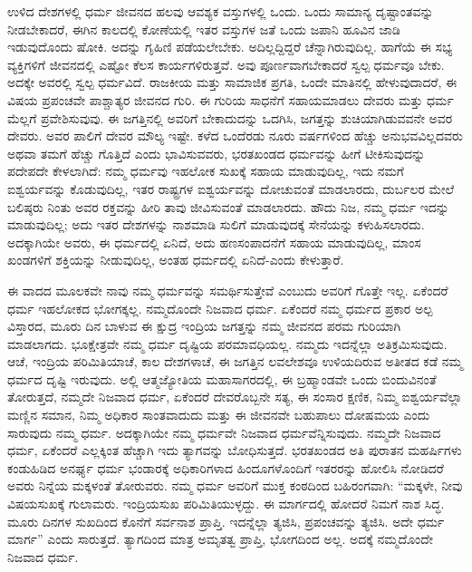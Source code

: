 ಉಳಿದ ದೇಶಗಳಲ್ಲಿ ಧರ್ಮ ಜೀವನದ ಹಲವು ಆವಶ್ಯಕ ವಸ್ತುಗಳಲ್ಲಿ ಒಂದು. ಒಂದು ಸಾಮಾನ್ಯ ದೃಷ್ಟಾಂತವನ್ನು ನೀಡಬೇಕಾದರೆ, ಈಗಿನ ಕಾಲದಲ್ಲಿ ಕೋಣೆಯಲ್ಲಿ ಇತರ ವಸ್ತುಗಳ ಜತೆ ಒಂದು ಜಪಾನಿ ಹೂವಿನ ಜಾಡಿ ಇಡುವುದೊಂದು ಷೋಕಿ. ಅದನ್ನು ಗೃಹಿಣಿ ಪಡೆಯಲೇಬೇಕು. ಅದಿಲ್ಲದ್ದಿದ್ದರೆ ಚೆನ್ನಾಗಿರುವುದಿಲ್ಲ. ಹಾಗೆಯೆ ಈ ಸಭ್ಯ ವ್ಯಕ್ತಿಗಳಿಗೆ ಜೀವನದಲ್ಲಿ ಎಷ್ಟೋ ಕೆಲಸ ಕಾರ್ಯಗಳಿರುತ್ತವೆ. ಅವು ಪೂರ್ಣವಾಗಬೇಕಾದರೆ ಸ್ವಲ್ಪ ಧರ್ಮವೂ ಬೇಕು. ಅದಕ್ಕೇ ಅವರಲ್ಲಿ ಸ್ವಲ್ಪ ಧರ್ಮವಿದೆ. ರಾಜಕೀಯ ಮತ್ತು ಸಾಮಾಜಿಕ ಪ್ರಗತಿ, ಒಂದೇ ಮಾತಿನಲ್ಲಿ ಹೇಳುವುದಾದರೆ, ಈ ವಿಷಯ ಪ್ರಪಂಚವೇ ಪಾಶ್ಚಾತ್ಯರ ಜೀವನದ ಗುರಿ. ಈ ಗುರಿಯ ಸಾಧನೆಗೆ ಸಹಾಯಮಾಡಲು ದೇವರು ಮತ್ತು ಧರ್ಮ ಮೆಲ್ಲಗೆ ಪ್ರವೇಶಿಸುವುವು. ಈ ಜಗತ್ತಿನಲ್ಲಿ ಅವರಿಗೆ ಬೇಕಾದುದನ್ನು ಒದಗಿಸಿ, ಜಗತ್ತನ್ನು ಶುಚಿಯಾಗಿಡುವವನೇ ಅವರ ದೇವರು. ಅವರ ಪಾಲಿಗೆ ದೇವರ ಮೌಲ್ಯ ಇಷ್ಟೇ. ಕಳೆದ ಒಂದೆರಡು ನೂರು ವರ್ಷಗಳಿಂದ ಹೆಚ್ಚು ಅನುಭವವಿಲ್ಲದವರು ಅಥವಾ ತಮಗೆ ಹೆಚ್ಚು ಗೊತ್ತಿದೆ ಎಂದು ಭಾವಿಸುವವರು, ಭರತಖಂಡದ ಧರ್ಮವನ್ನು ಹೀಗೆ ಟೀಕಿಸುವುದನ್ನು ಪದೇಪದೇ ಕೇಳಲಾಗಿದೆ: ನಮ್ಮ ಧರ್ಮವು ಇಹಲೋಕ ಸುಖಕ್ಕೆ ಸಹಾಯ ಮಾಡುವುದಿಲ್ಲ, ಇದು ನಮಗೆ ಐಶ್ವರ್ಯವನ್ನು ಕೊಡುವುದಿಲ್ಲ, ಇತರ ರಾಷ್ಟ್ರಗಳ ಐಶ್ವರ್ಯವನ್ನು ದೋಚುವಂತೆ ಮಾಡಲಾರದು, ದುರ್ಬಲರ ಮೇಲೆ ಬಲಿಷ್ಠರು ನಿಂತು ಅವರ ರಕ್ತವನ್ನು ಹೀರಿ ತಾವು ಜೀವಿಸುವಂತೆ ಮಾಡಲಾರದು. ಹೌದು ನಿಜ, ನಮ್ಮ ಧರ್ಮ ಇದನ್ನು ಮಾಡುವುದಿಲ್ಲ; ಅದು ಇತರ ದೇಶಗಳನ್ನು ನಾಶಮಾಡಿ ಸುಲಿಗೆ ಮಾಡುವುದಕ್ಕೆ ಸೇನೆಯನ್ನು ಕಳುಹಿಸಲಾರದು. ಅದಕ್ಕಾಗಿಯೇ ಅವರು, ಈ ಧರ್ಮದಲ್ಲಿ ಏನಿದೆ, ಅದು ಹಣಸಂಪಾದನೆಗೆ ಸಹಾಯ ಮಾಡುವುದಿಲ್ಲ, ಮಾಂಸ ಖಂಡಗಳಿಗೆ ಶಕ್ತಿಯನ್ನು ನೀಡುವುದಿಲ್ಲ, ಅಂತಹ ಧರ್ಮದಲ್ಲಿ ಏನಿದೆ-ಎಂದು ಕೇಳುತ್ತಾರೆ.

ಈ ವಾದದ ಮೂಲಕವೇ ನಾವು ನಮ್ಮ ಧರ್ಮವನ್ನು ಸಮರ್ಥಿಸುತ್ತೇವೆ ಎಂಬುದು ಅವರಿಗೆ ಗೊತ್ತೇ ಇಲ್ಲ. ಏಕೆಂದರೆ ಧರ್ಮ ಇಹಲೋಕದ ಭೋಗಕ್ಕಲ್ಲ. ನಮ್ಮದೊಂದೇ ನಿಜವಾದ ಧರ್ಮ. ಏಕೆಂದರೆ ನಮ್ಮ ಧರ್ಮದ ಪ್ರಕಾರ ಅಲ್ಪ ವಿಸ್ತಾರದ, ಮೂರು ದಿನ ಬಾಳುವ ಈ ಕ್ಷುದ್ರ ಇಂದ್ರಿಯ ಜಗತ್ತನ್ನು ನಮ್ಮ ಜೀವನದ ಪರಮ ಗುರಿಯಾಗಿ ಮಾಡಲಾಗದು. ಭೂಕ್ಷೇತ್ರವೇ ನಮ್ಮ ಧರ್ಮ ದೃಷ್ಟಿಯ ಪರಮಾವಧಿಯಲ್ಲ. ನಮ್ಮದು ಇದನ್ನೆಲ್ಲಾ ಅತಿಕ್ರಮಿಸುವುದು. ಆಚೆ, ಇಂದ್ರಿಯ ಪರಿಮಿತಿಯಾಚೆ, ಕಾಲ ದೇಶಗಳಾಚೆ, ಈ ಜಗತ್ತಿನ ಲವಲೇಶವೂ ಉಳಿಯದಿರುವ ಅತೀತದ ಕಡೆ ನಮ್ಮ ಧರ್ಮದ ದೃಷ್ಟಿ ಇರುವುದು. ಅಲ್ಲಿ ಆತ್ಮಜ್ಯೋತಿಯ ಮಹಾಸಾಗರದಲ್ಲಿ, ಈ ಬ್ರಹ್ಮಾಂಡವೇ ಒಂದು ಬಿಂದುವಿನಂತೆ ತೋರುತ್ತದೆ, ನಮ್ಮದೇ ನಿಜವಾದ ಧರ್ಮ, ಏಕೆಂದರೆ ದೇವರೊಬ್ಬನೇ ಸತ್ಯ, ಈ ಸಂಸಾರ ಕ್ಷಣಿಕ, ನಿಮ್ಮ ಐಶ್ವರ್ಯವೆಲ್ಲಾ ಮಣ್ಣಿನ ಸಮಾನ, ನಿಮ್ಮ ಅಧಿಕಾರ ಸಾಂತವಾದುದು ಮತ್ತು ಈ ಜೀವನವೇ ಬಹುಪಾಲು ದೋಷಮಯ ಎಂದು ಸಾರುವುದು ನಮ್ಮ ಧರ್ಮ. ಅದಕ್ಕಾಗಿಯೇ ನಮ್ಮ ಧರ್ಮವೇ ನಿಜವಾದ ಧರ್ಮವೆನ್ನಿಸುವುದು. ನಮ್ಮದೇ ನಿಜವಾದ ಧರ್ಮ, ಏಕೆಂದರೆ ಎಲ್ಲಕ್ಕಿಂತ ಹೆಚ್ಚಾಗಿ ಇದು ತ್ಯಾಗವನ್ನು ಬೋಧಿಸುತ್ತದೆ. ಭರತಖಂಡದ ಅತಿ ಪುರಾತನ ಮಹರ್ಷಿಗಳು ಕಂಡುಹಿಡಿದ ಅನರ್ಘ್ಯ ಧರ್ಮ ಭಂಡಾರಕ್ಕೆ ಅಧಿಕಾರಿಗಳಾದ ಹಿಂದೂಗಳೊಂದಿಗೆ ಇತರರನ್ನು ಹೋಲಿಸಿ ನೋಡಿದರೆ ಅವರು ನಿನ್ನೆಯ ಮಕ್ಕಳಂತೆ ತೋರುವರು. ನಮ್ಮ ಧರ್ಮ ಅವರಿಗೆ ಮುಕ್ತ ಕಂಠದಿಂದ ಬಹಿರಂಗವಾಗಿ: “ಮಕ್ಕಳೇ, ನೀವು ವಿಷಯಸುಖಕ್ಕೆ ಗುಲಾಮರು. ಇಂದ್ರಿಯಸುಖ ಪರಿಮಿತಿಯುಳ್ಳದ್ದು. ಈ ಮಾರ್ಗದಲ್ಲಿ ಹೋದರೆ ನಿಮಗೆ ನಾಶ ಸಿದ್ಧ. ಮೂರು ದಿನಗಳ ಸುಖದಿಂದ ಕೊನೆಗೆ ಸರ್ವನಾಶ ಪ್ರಾಪ್ತಿ. ಇದನ್ನೆಲ್ಲಾ ತ್ಯಜಿಸಿ, ಪ್ರಪಂಚವನ್ನು ತ್ಯಜಿಸಿ. ಅದೇ ಧರ್ಮ ಮಾರ್ಗ” ಎಂದು ಸಾರುತ್ತದೆ. ತ್ಯಾಗದಿಂದ ಮಾತ್ರ ಅಮೃತತ್ವ ಪ್ರಾಪ್ತಿ, ಭೋಗದಿಂದ ಅಲ್ಲ. ಅದಕ್ಕೆ ನಮ್ಮದೊಂದೇ ನಿಜವಾದ ಧರ್ಮ.

